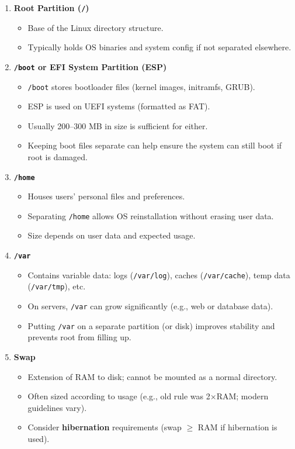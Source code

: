 \documentclass[a4paper]{report}
\begin{document}
\begin{enumerate}
    \item \textbf{Root Partition (\texttt{/})}
    \begin{itemize}
        \item Base of the Linux directory structure.
        \item Typically holds OS binaries and system config if not separated elsewhere.
    \end{itemize}

    \item \textbf{\texttt{/boot} or EFI System Partition (ESP)}
    \begin{itemize}
        \item \texttt{/boot} stores bootloader files (kernel images, initramfs, GRUB).
        \item ESP is used on UEFI systems (formatted as FAT).
        \item Usually 200–300 MB in size is sufficient for either.
        \item Keeping boot files separate can help ensure the system can still boot if root is damaged.
    \end{itemize}

    \item \textbf{\texttt{/home}}
    \begin{itemize}
        \item Houses users’ personal files and preferences.
        \item Separating \texttt{/home} allows OS reinstallation without erasing user data.
        \item Size depends on user data and expected usage.
    \end{itemize}

    \item \textbf{\texttt{/var}}
    \begin{itemize}
        \item Contains variable data: logs (\texttt{/var/log}), caches (\texttt{/var/cache}), temp data (\texttt{/var/tmp}), etc.
        \item On servers, \texttt{/var} can grow significantly (e.g., web or database data).
        \item Putting \texttt{/var} on a separate partition (or disk) improves stability and prevents root from filling up.
    \end{itemize}

    \item \textbf{Swap}
    \begin{itemize}
        \item Extension of RAM to disk; cannot be mounted as a normal directory.
        \item Often sized according to usage (e.g., old rule was 2×RAM; modern guidelines vary).
        \item Consider \textbf{hibernation} requirements (swap $\geq$ RAM if hibernation is used).
    \end{itemize}
\end{enumerate}
\end{document}
